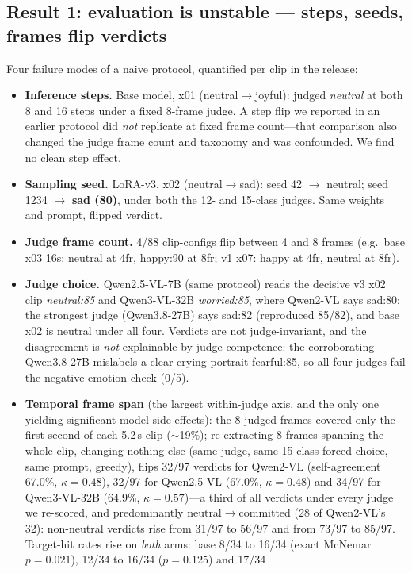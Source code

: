 \documentclass[10pt,twocolumn]{article}
\begin{document}
\subsection{Result 1: evaluation is unstable --- steps, seeds, frames flip verdicts}
Four failure modes of a naive protocol, quantified per clip in the release:
\begin{itemize}
\item \textbf{Inference steps.} Base model, x01 (neutral$\rightarrow$joyful): judged \emph{neutral}
at both 8 and 16 steps under a fixed 8-frame judge. A step flip we reported in an earlier protocol
did \emph{not} replicate at fixed frame count---that comparison also changed the judge frame count
and taxonomy and was confounded. We find no clean step effect.
\item \textbf{Sampling seed.} LoRA-v3, x02 (neutral$\rightarrow$sad): seed 42
$\rightarrow$ neutral; seed 1234 $\rightarrow$ \textbf{sad (80)}, under both the 12- and 15-class
judges. Same weights and prompt, flipped verdict.
\item \textbf{Judge frame count.} 4/88 clip-configs flip between 4 and 8 frames (e.g.\ base
x03 16s: neutral at 4fr, happy:90 at 8fr; v1 x07: happy at 4fr, neutral at 8fr).
\item \textbf{Judge choice.} Qwen2.5-VL-7B (same protocol) reads the decisive v3 x02 clip
\emph{neutral:85} and Qwen3-VL-32B \emph{worried:85}, where Qwen2-VL says sad:80; the strongest
judge (Qwen3.8-27B) says sad:82 (reproduced 85/82), and base x02 is neutral under all four. Verdicts
are not judge-invariant, and the disagreement is \emph{not} explainable by judge competence: the
corroborating Qwen3.8-27B mislabels a clear crying portrait fearful:85, so all four judges fail the
negative-emotion check (0/5).
\item \textbf{Temporal frame span} (the largest within-judge axis, and the only one yielding significant model-side effects): the 8 judged frames
covered only the first second of each 5.2\,s clip ($\sim$19\%); re-extracting 8 frames spanning the
whole clip, changing nothing else (same judge, same 15-class forced choice, same prompt, greedy),
flips 32/97 verdicts for Qwen2-VL (self-agreement 67.0\%, $\kappa{=}0.48$), 32/97 for Qwen2.5-VL
(67.0\%, $\kappa{=}0.48$) and 34/97 for Qwen3-VL-32B (64.9\%, $\kappa{=}0.57$)---a third of all verdicts
under every judge we re-scored, and predominantly neutral$\rightarrow$committed (28 of Qwen2-VL's 32):
non-neutral verdicts rise from 31/97 to 56/97 and from 73/97 to 85/97. Target-hit rates rise on
\emph{both} arms: base 8/34 to 16/34 (exact McNemar $p{=}0.021$), 12/34 to 16/34 ($p{=}0.125$) and 17/34

\end{itemize}
\end{document}
